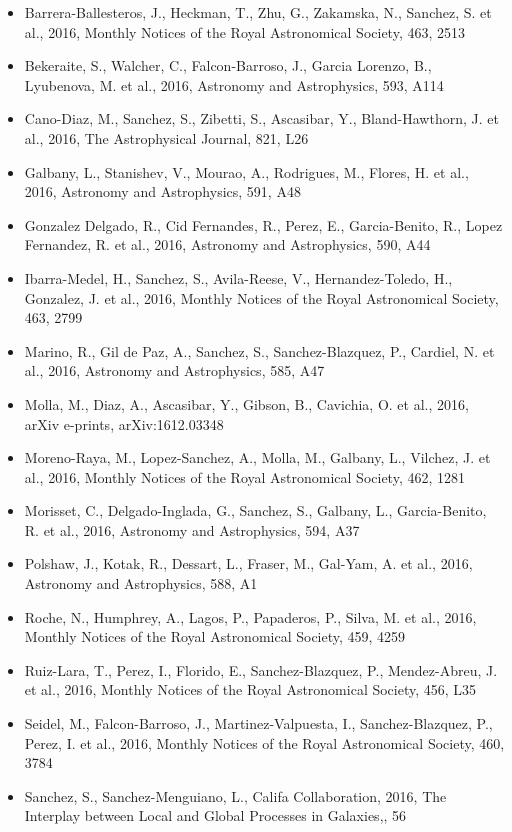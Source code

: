 \documentclass{letter}
\begin{document}
\begin{enumerate}
\begin{itemize}
\item Barrera-Ballesteros, J., Heckman, T., Zhu, G., Zakamska, N., Sanchez, S. et al., 2016, Monthly Notices of the Royal Astronomical Society, 463, 2513
\item Bekeraite, S., Walcher, C., Falcon-Barroso, J., Garcia Lorenzo, B., Lyubenova, M. et al., 2016, Astronomy and Astrophysics, 593, A114
\item Cano-Diaz, M., Sanchez, S., Zibetti, S., Ascasibar, Y., Bland-Hawthorn, J. et al., 2016, The Astrophysical Journal, 821, L26
\item Galbany, L., Stanishev, V., Mourao, A., Rodrigues, M., Flores, H. et al., 2016, Astronomy and Astrophysics, 591, A48
\item Gonzalez Delgado, R., Cid Fernandes, R., Perez, E., Garcia-Benito, R., Lopez Fernandez, R. et al., 2016, Astronomy and Astrophysics, 590, A44
\item Ibarra-Medel, H., Sanchez, S., Avila-Reese, V., Hernandez-Toledo, H., Gonzalez, J. et al., 2016, Monthly Notices of the Royal Astronomical Society, 463, 2799
\item Marino, R., Gil de Paz, A., Sanchez, S., Sanchez-Blazquez, P., Cardiel, N. et al., 2016, Astronomy and Astrophysics, 585, A47
\item Molla, M., Diaz, A., Ascasibar, Y., Gibson, B., Cavichia, O. et al., 2016, arXiv e-prints, arXiv:1612.03348
\item Moreno-Raya, M., Lopez-Sanchez, A., Molla, M., Galbany, L., Vilchez, J. et al., 2016, Monthly Notices of the Royal Astronomical Society, 462, 1281
\item Morisset, C., Delgado-Inglada, G., Sanchez, S., Galbany, L., Garcia-Benito, R. et al., 2016, Astronomy and Astrophysics, 594, A37
\item Polshaw, J., Kotak, R., Dessart, L., Fraser, M., Gal-Yam, A. et al., 2016, Astronomy and Astrophysics, 588, A1
\item Roche, N., Humphrey, A., Lagos, P., Papaderos, P., Silva, M. et al., 2016, Monthly Notices of the Royal Astronomical Society, 459, 4259
\item Ruiz-Lara, T., Perez, I., Florido, E., Sanchez-Blazquez, P., Mendez-Abreu, J. et al., 2016, Monthly Notices of the Royal Astronomical Society, 456, L35
\item Seidel, M., Falcon-Barroso, J., Martinez-Valpuesta, I., Sanchez-Blazquez, P., Perez, I. et al., 2016, Monthly Notices of the Royal Astronomical Society, 460, 3784
\item Sanchez, S., Sanchez-Menguiano, L., Califa Collaboration, 2016, The Interplay between Local and Global Processes in Galaxies,, 56

\end{itemize}
\end{enumerate}
\end{document}

